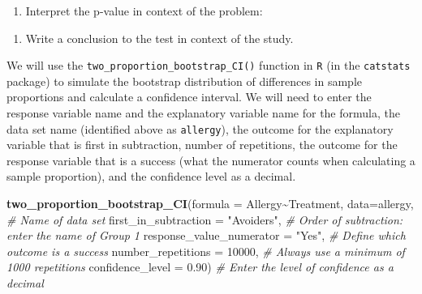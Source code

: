 \documentclass[
]{report}
\newenvironment{Shaded}{\begin{snugshade}}{\end{snugshade}}
\newcommand{\AttributeTok}[1]{\textcolor[rgb]{0.13,0.29,0.53}{#1}}
\newcommand{\CommentTok}[1]{\textcolor[rgb]{0.56,0.35,0.01}{\textit{#1}}}
\newcommand{\DecValTok}[1]{\textcolor[rgb]{0.00,0.00,0.81}{#1}}
\newcommand{\FloatTok}[1]{\textcolor[rgb]{0.00,0.00,0.81}{#1}}
\newcommand{\FunctionTok}[1]{\textcolor[rgb]{0.13,0.29,0.53}{\textbf{#1}}}
\newcommand{\NormalTok}[1]{#1}
\newcommand{\SpecialCharTok}[1]{\textcolor[rgb]{0.81,0.36,0.00}{\textbf{#1}}}
\newcommand{\StringTok}[1]{\textcolor[rgb]{0.31,0.60,0.02}{#1}}
\providecommand{\tightlist}{%
  \setlength{\itemsep}{0pt}\setlength{\parskip}{0pt}}
\begin{document}
\begin{enumerate}
\def\labelenumi{\arabic{enumi}.}
\setcounter{enumi}{10}
\tightlist
\item
  Interpret the p-value in context of the problem:
\end{enumerate}

\vspace{1in}

\begin{enumerate}
\def\labelenumi{\arabic{enumi}.}
\setcounter{enumi}{11}
\tightlist
\item
  Write a conclusion to the test in context of the study.
\end{enumerate}

\vspace{1in}

\newpage

We will use the \texttt{two\_proportion\_bootstrap\_CI()} function in \texttt{R} (in the \texttt{catstats} package) to simulate the bootstrap distribution of differences in sample proportions and calculate a confidence interval. We will need to enter the response variable name and the explanatory variable name for the formula, the data set name (identified above as \texttt{allergy}), the outcome for the explanatory variable that is first in subtraction, number of repetitions, the outcome for the response variable that is a success (what the numerator counts when calculating a sample proportion), and the confidence level as a decimal.

\begin{Shaded}
\begin{Highlighting}[]
\FunctionTok{two\_proportion\_bootstrap\_CI}\NormalTok{(}\AttributeTok{formula =}\NormalTok{ Allergy}\SpecialCharTok{\textasciitilde{}}\NormalTok{Treatment, }
        \AttributeTok{data=}\NormalTok{allergy, }\CommentTok{\# Name of data set}
        \AttributeTok{first\_in\_subtraction =} \StringTok{"Avoiders"}\NormalTok{, }\CommentTok{\# Order of subtraction: enter the name of Group 1}
        \AttributeTok{response\_value\_numerator =} \StringTok{"Yes"}\NormalTok{, }\CommentTok{\# Define which outcome is a success }
        \AttributeTok{number\_repetitions =} \DecValTok{10000}\NormalTok{, }\CommentTok{\# Always use a minimum of 1000 repetitions}
        \AttributeTok{confidence\_level =} \FloatTok{0.90}\NormalTok{) }\CommentTok{\# Enter the level of confidence as a decimal}
\end{Highlighting}
\end{Shaded}
\end{document}
